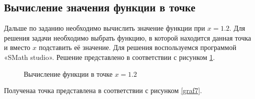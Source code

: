 \documentclass[russian,utf8,nocolumnxxxi,nocolumnxxxii]{eskdtext}
\begin{document}
\subsection{Вычисление значения функции в точке} \label{tact}

Дальше по заданию необходимо вычислить значение функции при $x=1.2$. Для решения задачи необходимо выбрать функцию, в которой находится данная точка и вместо $x$ подставить её значение. Для решения воспользуемся программой  «SMath studio». Решение представлено в соответствии с рисунком \ref{x1.2}.

\begin{figure}[h!]
\begin{center}
\begin{minipage}[h]{0.8\linewidth}
\end{minipage}
\caption{Вычисление функции в точке $x=1.2$ } \label{x1.2}
\end{center}
\end{figure}

Полученаа точка представлена в соответствии с рисунком \ref{graf7}.
\end{document}
